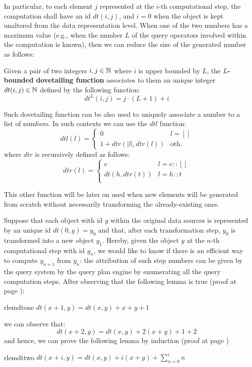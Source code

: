 In particular, to each element $j$ represented at the $i$-th computational step, the computation shall have an id $dt(i,j)$, and $i=0$ when the object is kept unaltered from the data representation level. When one of the two numbers has a maximum value (e.g., when the number $L$ of the query operators involved within the computation is known), then we can reduce the size of the generated number as follows:

\begin{definition}
	Given a pair of two integers $i,j\in \mathbb{N}$ where $i$ is upper bounded by $L$, the \textbf{$L$-bounded dovetailing function} associates to them an unique integer  $dt(i,j)\in\mathbb{N}$ defined by the following function:
	\[dt^L(i,j)=j\cdot(L+1)+i\]
\end{definition}

Such dovetailing function can be also used to uniquely associate a number to a list of numbers. In such contexts we can use the $dtl$ function: 
\begin{equation}\label{eq:dtl}
dtl(l)=\begin{cases}
0 & l = []\\
1+dtr(|l|,dtr(l)) & \textrm{oth.}
\end{cases}
\end{equation}
where $dtr$ is recursively defined as follows:
\[dtr(l)= \begin{cases}
e & l = e::[]\\
dt(h,dtr(t)) & l = h::t\\
\end{cases}\]

This other function will be later on used when new elements will be generated from scratch without necessarily transforming the already-existing ones.

Suppose that each object with id $y$ within the original data sources is represented by an unique id $dt(0,y)=y_0$ and that, after each transformation step, $y_0$ is transformed into a new object $y_{1}$. Hereby, given the object $y$ at the $n$-th computational step with id $y_n$, we would like to know if there is an efficient way to compute $y_{n+1}$ from $y_{n}$: the attribution of such step numbers can be given by the query system by the query plan engine by enumerating all the query computation steps. After observing that the following lemma is true (proof at page \pageref{proof:dtone}):
\begin{restatable}{rlem}{dtone}
	\label{dtone}
	$dt(x+1,y)=dt(x,y)+x+y+1$
\end{restatable}
we can observe that:
\[dt(x+2,y)=dt(x,y)+2(x+y)+1+2\]
and hence, we can prove the following lemma by induction (proof at page \pageref{proof:dttwo})
\begin{restatable}{rlem}{dttwo}
	\label{dttwo}
	$dt(x+i,y)=dt(x,y)+i(x+y)+\sum_{n=0}^in$
\end{restatable}

